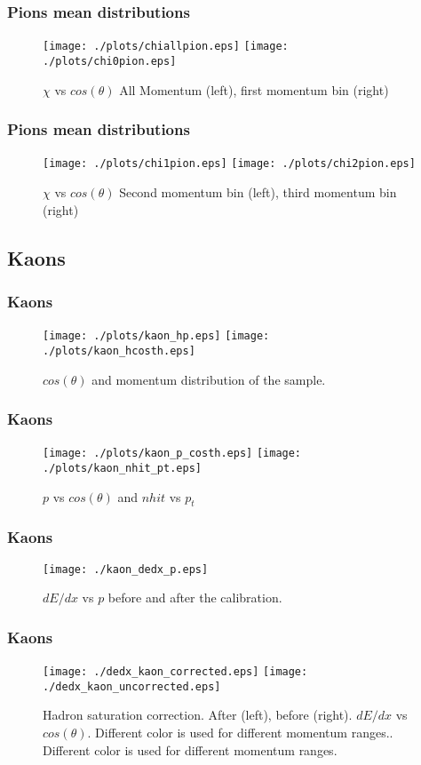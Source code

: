 \documentclass{beamer}
\begin{document}
\begin{frame}\frametitle{Pions mean distributions}
\begin{figure}[!htp]
\centering
\texttt{[image: ./plots/chiallpion.eps]}
\texttt{[image: ./plots/chi0pion.eps]}
\caption{$\chi$ vs $cos(\theta)$ All Momentum (left), first momentum bin (right)}
\end{figure}
\end{frame}

\begin{frame}\frametitle{Pions mean distributions}
\begin{figure}[!htp]
\centering
\texttt{[image: ./plots/chi1pion.eps]}
\texttt{[image: ./plots/chi2pion.eps]}
\caption{$\chi$ vs $cos(\theta)$ Second momentum bin (left), third momentum bin (right)}
\end{figure}
\end{frame}

\subsection{Kaons}
\begin{frame}\frametitle{Kaons}
\begin{figure}
\texttt{[image: ./plots/kaon\_hp.eps]} 
\texttt{[image: ./plots/kaon\_hcosth.eps]} 
\caption{$cos(\theta)$ and momentum distribution of the sample.}
\end{figure}
\end{frame}

\begin{frame}\frametitle{Kaons}
\begin{figure}
\texttt{[image: ./plots/kaon\_p\_costh.eps]} 
\texttt{[image: ./plots/kaon\_nhit\_pt.eps]} 
\caption{$p$ vs $cos(\theta)$ and $nhit$ vs $p_{t}$}
\end{figure}
\end{frame}

\begin{frame}\frametitle{Kaons}
\begin{figure}
\texttt{[image: ./kaon\_dedx\_p.eps]} 
\caption{$dE/dx$ vs $p$ before and after the calibration.}
\end{figure}
\end{frame}

\begin{frame}\frametitle{Kaons}
\begin{figure}
\texttt{[image: ./dedx\_kaon\_corrected.eps]} 
\texttt{[image: ./dedx\_kaon\_uncorrected.eps]} 
\caption{Hadron saturation correction. After (left), before (right). $dE/dx$ vs $cos(\theta)$. Different color is used for different momentum ranges.. Different color is used for different momentum ranges.}
\end{figure}
\end{frame}
\end{document}
